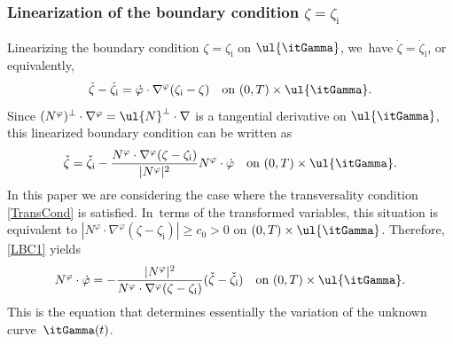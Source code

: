 \subsubsection{Linearization of the boundary condition $\zeta=\zeta_\mathrm{i}$}
Linearizing the boundary condition $\zeta=\zeta_\mathrm{i}$ on $\ul{\itGamma}$, we~have $\dot{\zeta}=\dot{\zeta}_\mathrm{i}$, or equivalently,
\[
\check{\zeta}-\check{\zeta}_\mathrm{i} = \dot{\varphi}\cdot\nabla^\varphi(\zeta_\mathrm{i}-\zeta) \quad\text{on } (0,T)\times\ul{\itGamma}.
\]
Since $(N^\varphi)^\perp\cdot\nabla^\varphi=\ul{N}^\perp\cdot\nabla$ is a tangential derivative on $\ul{\itGamma}$,
this linearized boundary condition can be written as
\begin{equation}\label{LBC1}
\check{\zeta}=\check{\zeta}_\mathrm{i}-\frac{N^\varphi\cdot\nabla^\varphi(\zeta-\zeta_\mathrm{i})}{|N^\varphi|^2} N^\varphi\cdot\dot{\varphi}
\quad\text{on } (0,T)\times\ul{\itGamma}.
\end{equation}
In this paper we are considering the case where the transversality condition \eqref{TransCond} is satisfied. In~terms of the transformed variables,
this situation is equivalent to $|N^\varphi\cdot\nabla^\varphi(\zeta-\zeta_\mathrm{i})| \geq c_0>0$ on $(0,T)\times\ul{\itGamma}$.
Therefore, \eqref{LBC1} yields
\begin{equation}\label{EqPhi}
N^\varphi\cdot\dot{\varphi} = -\frac{|N^\varphi|^2}{N^\varphi\cdot\nabla^\varphi(\zeta-\zeta_\mathrm{i})}(\check{\zeta} -\check{\zeta}_\mathrm{i})
\quad\text{on } (0,T)\times\ul{\itGamma}.
\end{equation}
This is the equation that determines essentially the variation of the unknown curve~$\itGamma(t)$.

